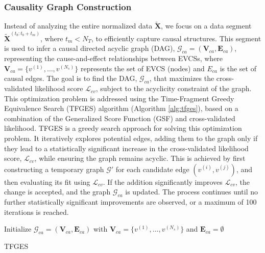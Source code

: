 \documentclass[lettersize,journal]{IEEEtran}
\begin{document}
\subsubsection{Causality Graph Construction}
Instead of analyzing the entire normalized data $\tilde{\bm{X}}$, we focus on a data segment $\tilde{\bm{X}}^{(t_{b}: t_{b}+t_{m})}$, where $t_m < N_T$, to efficiently capture causal structures. This segment is used to infer a causal directed acyclic graph (DAG), $\bm{\mathcal{G}}_{ca} = (\bm{V}_{ca}, \bm{E}_{ca})$, representing the cause-and-effect relationships between EVCSs, where $\bm{V}_{ca} = \{v^{(1)}, \dots, v^{(N_s)}\}$ represents the set of EVCS (nodes) and $E_{ca}$ is the set of causal edges. The goal is to find the DAG, $\bm{\mathcal{G}}_{ca}$, that maximizes the cross-validated likelihood score $\mathcal{L}_{cv}$, subject to the acyclicity constraint of the graph.  This optimization problem is addressed using the Time-Fragment Greedy Equivalence Search (TFGES) algorithm (Algorithm \ref{alg:tfges}), based on a combination of the Generalized Score Function (GSF) \cite{huang2018generalized} and cross-validated likelihood. 
TFGES is a greedy search approach for solving this optimization problem. It iteratively explores potential edges, adding them to the graph only if they lead to a statistically significant increase in the cross-validated likelihood score, $\mathcal{L}_{cv}$, while ensuring the graph remains acyclic. This is achieved by first constructing a temporary graph $\mathcal{G}'$ for each candidate edge $(v^{(i)}, v^{(j)})$, and then evaluating its fit using $\mathcal{L}_{cv}$. If the addition significantly improves $\mathcal{L}_{cv}$, the change is accepted, and the graph $\bm{\mathcal{G}}_{ca}$ is updated. The process continues until no further statistically significant improvements are observed, or a maximum of 100 iterations is reached.

\begin{algorithm}[b!]
\small
\SetAlgoLined
{}

Initialize $\bm{\mathcal{G}}_{ca} = (\bm{V}_{ca}, \bm{E}_{ca})$ with $\bm{V}_{ca} = \{v^{(1)}, \dots, v^{(N_s)}\}$ and  $\bm{E}_{ca} = \emptyset$\;

\caption{TFGES}
\label{alg:tfges}
\end{algorithm}
\end{document}
